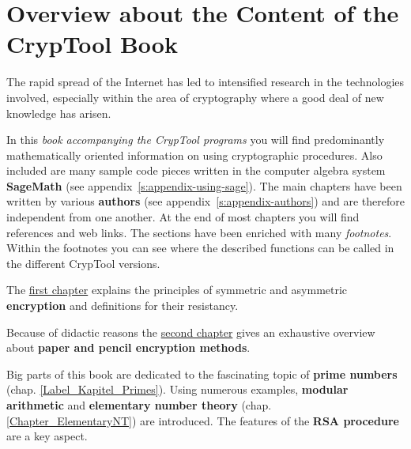 
\makeatletter \renewcommand{\thepage}{~\csname @roman\endcsname \c@page~} \makeatother
\clearpage{}
\makeatletter \renewcommand{\thepage}{\csname @roman\endcsname \c@page} \makeatother
{}
\chapter*{Overview about the Content of the CrypTool Book}  

\parskip 4pt
The rapid spread of the Internet has led to intensified research in the
technologies involved, especially within the area of cryptography where a good
deal of new knowledge has arisen.

In this {\em book accompanying the CrypTool programs} 
you will find predominantly mathematically oriented information on using
cryptographic procedures. Also included are many sample code pieces written in the
computer algebra system {\bf SageMath} (see appendix~\ref{s:appendix-using-sage}).
The main chapters have been written by various {\bf authors}
(see appendix~\ref{s:appendix-authors}) %
and are therefore independent from one another. At the end of most chapters
you will find references and web links.
The sections have been enriched with many {\em footnotes}. Within the footnotes
you can see where the described functions can be called in the different CrypTool
versions.

The \hyperlink{Kapitel_1}{first chapter} explains the principles of symmetric
and asymmetric {\bf encryption} and definitions for their resistancy.

Because of didactic reasons the \hyperlink{Kapitel_PaperandPencil}
{second chapter} gives an exhaustive overview
about {\bf paper and pencil encryption methods}.

Big parts of this book are dedicated to the fascinating topic of 
{\bf prime numbers} (chap. \ref{Label_Kapitel_Primes}).
Using numerous examples, {\bf modular arithmetic} and 
{\bf elementary number theory} (chap. \ref{Chapter_ElementaryNT})
are introduced. The features of the {\bf RSA procedure} are a key aspect.

